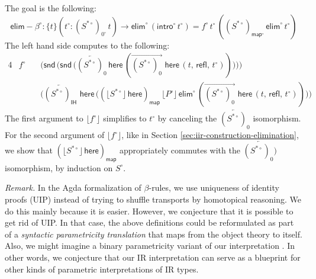 \documentclass[acmsmall,screen,review,anonymous]{acmart}
\newcommand{\msf}[1]{{\mathsf{#1}}}
\newcommand{\intro}{\msf{intro}}
\newcommand{\IH}{\msf{IH}}
\newcommand{\map}{\msf{map}}
\newcommand{\elim}{\msf{elim}}
\newcommand{\snd}{\msf{snd}}
\newcommand{\floord}[1]{\lfloor #1 \rfloor}
\newcommand{\ora}[1]{\overrightarrow{#1}}
\newcommand{\ola}[1]{\overleftarrow{#1}}
\newcommand{\w}{\circ}
\newcommand{\refl}{\msf{refl}}
\newcommand{\here}{\msf{here}}
\newcommand{\Ssw}{S^{*\w}}
\newcommand{\PSbe}{{(\floord{S^{*\circ}}\,\here)}}
\newcommand{\elimbeta}{\elim\!-\!\!\beta}
\begin{document}
\begin{definition}[Interpretation of $\elimbeta$]
The goal is the following:
\[ \elimbeta^\w : \{t\}(t^\w : (\Ssw)_{0^\w}\,t) \to \elim^\w\,(\intro^\w\,t^\w) = f^\w\,t^\w\,((\Ssw)_{\map^\w}\,\elim^\w\,t^\w) \]
The left hand side computes to the following:
\begin{alignat*}{4}
  &f^\w\,&&\Big(\snd\,\big(\snd\,\big(\ola{(S^{*\w})_0}\,\here\,(\ora{(\Ssw)_0}\,\,\here\,(t,\,\refl,\,t^\w))\big)\big)\Big)\\
  &      &&\Big(\ola{(S^{*\w})_{\IH}}\,\,\here\,\Big(\PSbe_\map\,\floord{P^\w}\,\elim^\w\,(\ora{(\Ssw)_0}\,\,\here\,(t,\,\refl,\,t^\w))\Big)\Big)
\end{alignat*}
The first argument to $\floord{f^\w}$ simplifies to $t^\w$ by canceling the $\ola{(S^{*\w})_0}$
isomorphism. For the second argument of $\floord{f^\w}$, like in Section \ref{sec:iir-construction-elimination}, we show that
$\PSbe_\map$ appropriately commutes with the $\ola{(S^{*\w})_0)}$ isomorphism, by induction on $S^\w$.

\emph{Remark.} In the Agda formalization of $\beta$-rules, we use uniqueness of identity proofs
(UIP) instead of trying to shuffle transports by homotopical reasoning. We do this mainly because it
is easier. However, we conjecture that it is possible to get rid of UIP. In that case, the above
definitions could be reformulated as part of a \emph{syntactic parametricity translation} that maps
from the object theory to itself. Also, we might imagine a binary parametricity variant of our
interpretation \cite{bernardy2010parametricity}. In other words, we conjecture that our IR interpretation can serve as a
blueprint for other kinds of parametric interpretations of IR types.
\end{definition}
\end{document}
